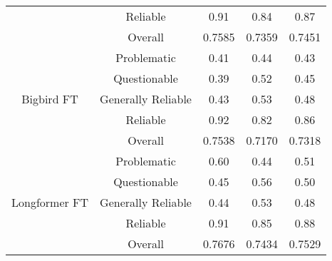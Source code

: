 \begin{table}[htbp]
\begin{tabular}{| c | c | c | c | c |}
                                                          & Reliable           & 0.91               & 0.84            & 0.87            \\\cline{2-5}
                                                          & Overall            & 0.7585             & 0.7359          & 0.7451          \\
        \hline
        \multirow{5}{*}{Bigbird FT}                       & Problematic        & 0.41               & 0.44            & 0.43            \\
                                                          & Questionable       & 0.39               & 0.52            & 0.45            \\
                                                          & Generally Reliable & 0.43               & 0.53            & 0.48            \\
                                                          & Reliable           & 0.92               & 0.82            & 0.86            \\\cline{2-5}
                                                          & Overall            & 0.7538             & 0.7170          & 0.7318          \\
        \hline
        \multirow{5}{*}{Longformer FT}                    & Problematic        & 0.60               & 0.44            & 0.51            \\
                                                          & Questionable       & 0.45               & 0.56            & 0.50            \\
                                                          & Generally Reliable & 0.44               & 0.53            & 0.48            \\
                                                          & Reliable           & 0.91               & 0.85            & 0.88            \\\cline{2-5}
                                                          & Overall            & 0.7676             & 0.7434          & 0.7529          \\
        \hline

\end{tabular}
\end{table}
